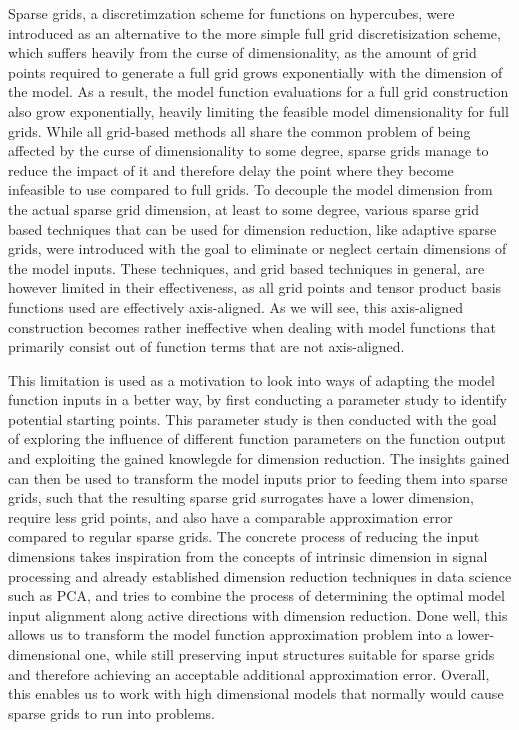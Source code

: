 \documentclass[
  a4paper,  %
  twoside,  %
  bibliography=totoc,
  headsepline,
  cleardoublepage=empty,
  parskip=half,
  draft=false
]{scrbook}
\begin{document}
Sparse grids, a discretimzation scheme for functions on hypercubes, were introduced as an alternative to the more simple full grid discretisization scheme, which suffers heavily from the curse of dimensionality, as the amount of grid points required to generate a full grid grows exponentially with the dimension of the model.
As a result, the model function evaluations for a full grid construction also grow exponentially, heavily limiting the feasible model dimensionality for full grids.
While all grid-based methods all share the common problem of being affected by the curse of dimensionality to some degree, sparse grids manage to reduce the impact of it and therefore delay the point where they become infeasible to use compared to full grids.
To decouple the model dimension from the actual sparse grid dimension, at least to some degree, various sparse grid based techniques that can be used for dimension reduction, like adaptive sparse grids, were introduced with the goal to eliminate or neglect certain  dimensions of the model inputs.
These techniques, and grid based techniques in general, are however limited in their effectiveness, as all grid points and tensor product basis functions used are effectively axis-aligned.
As we will see, this axis-aligned construction becomes rather ineffective when dealing with model functions that primarily consist out of function terms that are not axis-aligned.

This limitation is used as a motivation to look into ways of adapting the model function inputs in a better way, by first conducting a parameter study to identify potential starting points.
This parameter study is then conducted with the goal of exploring the influence of different function parameters on the function output and exploiting the gained knowlegde for dimension reduction.
The insights gained can then be used to transform the model inputs prior to feeding them into sparse grids, such that the resulting sparse grid surrogates have a lower dimension, require less grid points, and also have a comparable approximation error compared to regular sparse grids.
The concrete process of reducing the input dimensions takes inspiration from the concepts of intrinsic dimension in signal processing and already established dimension reduction techniques in data science such as PCA, and tries to combine the process of determining the optimal model input alignment along active directions with dimension reduction.
Done well, this allows us to transform the model function approximation problem into a lower-dimensional one, while still preserving input structures suitable for sparse grids and therefore achieving an acceptable additional approximation error.
Overall, this enables us to work with high dimensional models that normally would cause sparse grids to run into problems.
\end{document}
